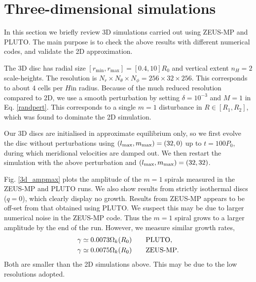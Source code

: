 \section{Three-dimensional simulations}
In this section we briefly review 3D simulations carried 
out using ZEUS-MP and PLUTO. The main purpose is to check 
the above results with different numerical codes, and validate  
the 2D approximation.    

The 3D disc has radial size
$[r_\mathrm{min},r_\mathrm{max}]=[0.4,10]R_0$ and vertical extent 
$n_H=2$ scale-heights. The resolution is $N_r\times N_\theta\times
N_\phi=256\times32\times256$. This corresponds to about $4$ cells per
$H$in radius. 
Because of the much reduced resolution 
compared to 2D, we use a smooth perturbation by setting
$\delta = 10^{-3}$ and $M=1$ in Eq. \ref{randpert}. This corresponds
to a single $m=1$ disturbance in $R\in[R_1,R_2]$, which was found to dominate
the 2D simulation.  

Our 3D discs are initialised in approximate equilibrium only, so we
first evolve the disc without perturbations using  
$(l_\mathrm{max},m_\mathrm{max})=(32,0)$ up to $t=100P_0$, during which 
meridional velocities are damped out. We then restart the simulation
with the above perturbation and $(l_\mathrm{max},m_\mathrm{max})=(32,32)$. 


Fig. \ref{3d_ampmax} plots the amplitude of the $m=1$ spirals measured
in the ZEUS-MP and PLUTO runs. We also show results from strictly
isothermal discs ($q=0$), which clearly display no growth. %
Results from ZEUS-MP appears to be off-set from that obtained using
PLUTO. We suspect this may be due to larger numerical noise in the
ZEUS-MP code. Thus the $m=1$ spiral grows to a larger amplitude by the
end of the run. However, we measure similar growth rates,
\begin{align*}
&\gamma \simeq 0.0073\Omega_k(R_0) \quad\quad \mathrm{PLUTO},\\
&\gamma \simeq 0.0075\Omega_k(R_0) \quad\quad {\operatorname{ZEUS-MP}}.
\end{align*}
Both are smaller than the 2D simulations above. This may be due to the
low resolutions adopted. 

